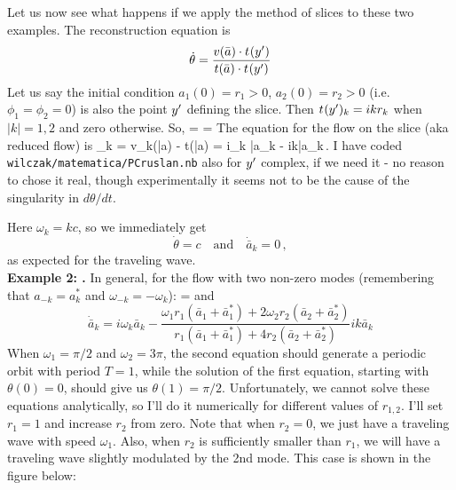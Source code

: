 Let us now see what happens if we apply the method of slices to these two examples.
The reconstruction equation is
\[ \dot{\theta} = \frac{v(\bar{a}) \cdot t_{}(y')}{t(\bar{a}) \cdot t_{}(y')} \]
Let us say the initial condition $a_1(0) = r_1 > 0$, $a_2(0) = r_2 > 0$
(i.e. $\phi_1 = \phi_2 = 0$) is also the point ${y'}$ defining the slice.  Then
$t_{}(y')_k = ikr_k$ when $|k| = 1,2$ and zero otherwise.  So,
\beq
\dot{\theta} = 
                = 
The equation for the flow on the slice (aka reduced flow) is
\beq
{}_k = v_k(\bar{a}) -  t(\bar{a})
                   = i\omega_k \bar{a}_k -  ik\bar{a}_k\,.
\medskip{}
I have coded \texttt{wilczak/matematica/PCruslan.nb} also for
$\slicep$ complex, if we need it - no reason to chose it real,
though experimentally it seems not to be the cause of the singularity in
$d\theta/dt$.

 Here $\omega_k = kc$, so we immediately get
\[ \dot{\theta} = c \quad \mathrm{and} \quad \dot{\bar{a}}_k = 0\,, \]
as expected for the traveling wave.\\
{\bf Example 2:  \Rpo.} In general, for the flow with two non-zero
modes (remembering that $a_{-k} = a_k^*$ and $\omega_{-k} =
-\omega_k$):
\beq
 \dot{\theta} = 
and
\[ \dot{\bar{a}}_k = i\omega_k \bar{a}_k - \frac{\omega_1 r_1 (\bar{a}_1 + \bar{a}_1^*) + 2\omega_2 r_2 (\bar{a}_2 + \bar{a}_2^*)}{r_1(\bar{a}_1 + \bar{a}_1^*) + 4r_2 (\bar{a}_2 + \bar{a}_2^*)}ik\bar{a}_k \]
When $\omega_1 = \pi/2$ and $\omega_2 = 3\pi$, the second equation should generate a periodic orbit with period $T = 1$, while the solution of the first equation, starting with $\theta(0) = 0$, should give us $\theta(1) = \pi/2$.  Unfortunately, we cannot solve these equations analytically, so I'll do it numerically for different values of $r_{1,2}$.  I'll set $r_1 = 1$ and increase $r_2$ from zero.  Note that when $r_2 = 0$, we just have a traveling wave with speed $\omega_1$.  Also, when $r_2$ is sufficiently smaller than $r_1$, we will have a traveling wave slightly modulated by the 2nd mode.  This case is shown in the figure below:

